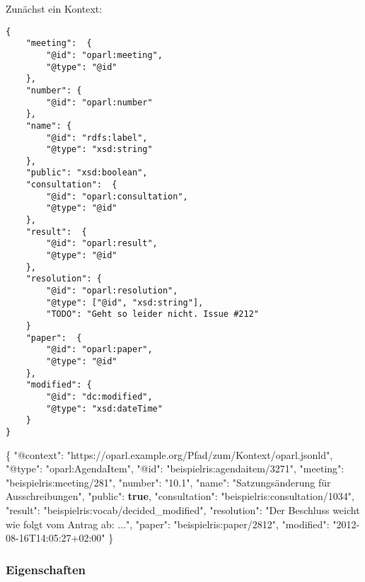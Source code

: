 \documentclass[,a4paper]{article}
\newenvironment{Shaded}{}{}
\newcommand{\KeywordTok}[1]{\textcolor[rgb]{0.00,0.44,0.13}{\textbf{{#1}}}}
\newcommand{\DataTypeTok}[1]{\textcolor[rgb]{0.56,0.13,0.00}{{#1}}}
\newcommand{\StringTok}[1]{\textcolor[rgb]{0.25,0.44,0.63}{{#1}}}
\newcommand{\FunctionTok}[1]{\textcolor[rgb]{0.02,0.16,0.49}{{#1}}}
\begin{document}
Zunächst ein Kontext:

\begin{verbatim}
{   
    "meeting":  {
        "@id": "oparl:meeting",
        "@type": "@id"
    },
    "number": {
        "@id": "oparl:number"
    },
    "name": {
        "@id": "rdfs:label",
        "@type": "xsd:string"
    },
    "public": "xsd:boolean",
    "consultation":  {
        "@id": "oparl:consultation",
        "@type": "@id"
    },
    "result":  {
        "@id": "oparl:result",
        "@type": "@id"
    },
    "resolution": {
        "@id": "oparl:resolution",
        "@type": ["@id", "xsd:string"],
        "TODO": "Geht so leider nicht. Issue #212"
    }
    "paper":  {
        "@id": "oparl:paper",
        "@type": "@id"
    },
    "modified": {
        "@id": "dc:modified",
        "@type": "xsd:dateTime"
    }   
}
\end{verbatim}

\begin{Shaded}
\begin{Highlighting}[]
\FunctionTok{\{}
    \DataTypeTok{"@context"}\FunctionTok{:} \StringTok{"https://oparl.example.org/Pfad/zum/Kontext/oparl.jsonld"}\FunctionTok{,}
    \DataTypeTok{"@type"}\FunctionTok{:} \StringTok{"oparl:AgendaItem"}\FunctionTok{,}
    \DataTypeTok{"@id"}\FunctionTok{:} \StringTok{"beispielris:agendaitem/3271"}\FunctionTok{,}
    \DataTypeTok{"meeting"}\FunctionTok{:} \StringTok{"beispielris:meeting/281"}\FunctionTok{,}
    \DataTypeTok{"number"}\FunctionTok{:} \StringTok{"10.1"}\FunctionTok{,}
    \DataTypeTok{"name"}\FunctionTok{:} \StringTok{"Satzungsänderung für Ausschreibungen"}\FunctionTok{,}
    \DataTypeTok{"public"}\FunctionTok{:} \KeywordTok{true}\FunctionTok{,}
    \DataTypeTok{"consultation"}\FunctionTok{:} \StringTok{"beispielris:consultation/1034"}\FunctionTok{,}
    \DataTypeTok{"result"}\FunctionTok{:} \StringTok{"beispielris:vocab/decided_modified"}\FunctionTok{,}
    \DataTypeTok{"resolution"}\FunctionTok{:} \StringTok{"Der Beschluss weicht wie folgt vom Antrag ab: ..."}\FunctionTok{,}
    \DataTypeTok{"paper"}\FunctionTok{:} \StringTok{"beispielris:paper/2812"}\FunctionTok{,}
    \DataTypeTok{"modified"}\FunctionTok{:} \StringTok{"2012-08-16T14:05:27+02:00"}
\FunctionTok{\}}
\end{Highlighting}
\end{Shaded}

\subsubsection{Eigenschaften}\label{eigenschaften-5}
\end{document}
